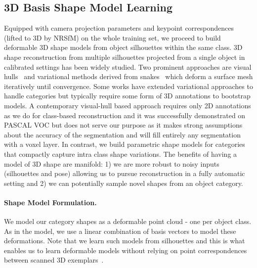 \subsection{3D Basis Shape Model Learning}
Equipped with camera projection parameters and keypoint correspondences (lifted to 3D by NRSfM) on the whole training set, we proceed to build deformable 3D shape models from object silhouettes within the same class. 3D shape reconstruction from multiple silhouettes projected from a single object in calibrated settings has been widely studied. Two prominent approaches are visual hulls~\cite{laurentini1994hull} and variational methods derived from snakes~\cite{esteban2004snake,yusuf2006snake} which deform a surface mesh iteratively until convergence. Some works have extended variational approaches to handle categories \cite{cashman2013dolphins,chen20123d} but typically require some form of 3D annotations to bootstrap models. A contemporary visual-hull based approach \cite{carvi14} requires only 2D annotations as we do for class-based reconstruction and it was successfully demonstrated on PASCAL VOC but does not serve our purpose as it makes strong assumptions about the accuracy of the segmentation and will fill entirely any segmentation with a voxel layer. In contrast, we build parametric shape models for categories that compactly capture intra class shape variations. The benefits of having a model of 3D shape are manifold: 1) we are more robust to noisy inputs (silhouettes and pose) allowing us to pursue reconstruction in a fully automatic setting and 2) we can potentially sample novel shapes from an object category.


\paragraph{Shape Model Formulation.} We model our category shapes as a deformable point cloud - one per object class. As in the \nrsfm model, we use a linear combination of basis vectors to model these deformations. Note that we learn such models from silhouettes and this is what enables us to learn deformable models without relying on point correspondences between scanned 3D exemplars~\cite{blanz2003face}.

